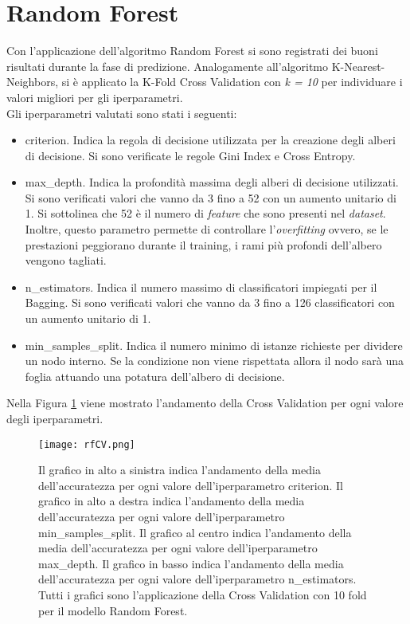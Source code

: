 \section{Random Forest}
Con l'applicazione dell'algoritmo Random Forest si sono registrati dei buoni risultati durante la fase di predizione. Analogamente all'algoritmo K-Nearest-Neighbors, si è applicato la K-Fold Cross Validation con \emph{k = 10} per individuare i valori migliori per gli iperparametri.\\
Gli iperparametri valutati sono stati i seguenti:
\begin{itemize}
	\item \textsf{criterion}. Indica la regola di decisione utilizzata per la creazione degli alberi di decisione. Si sono verificate le regole Gini Index e Cross Entropy.
	\item \textsf{max\_depth}. Indica la profondità massima degli alberi di decisione utilizzati. Si sono verificati valori che vanno da 3 fino a 52 con un aumento unitario di 1. Si sottolinea che 52 è il numero di \emph{feature} che sono presenti nel \emph{dataset}. Inoltre, questo parametro permette di controllare l'\emph{overfitting} ovvero, se le prestazioni peggiorano durante il training, i rami più profondi dell'albero vengono tagliati.
	\item \textsf{n\_estimators}. Indica il numero massimo di classificatori impiegati per il Bagging. Si sono verificati valori che vanno da 3 fino a 126 classificatori con un aumento unitario di 1.
	\item \textsf{min\_samples\_split}. Indica il numero minimo di istanze richieste per dividere un nodo interno. Se la condizione non viene rispettata allora il nodo sarà una foglia attuando una potatura dell'albero di decisione.
\end{itemize}
Nella Figura \ref{fig:rfCV} viene mostrato l'andamento della Cross Validation per ogni valore degli iperparametri.
\begin{figure}[]
	\begin{center}
		\texttt{[image: rfCV.png]}
		\caption{Il grafico in alto a sinistra indica l'andamento della media dell'accuratezza per ogni valore dell'iperparametro \textsf{criterion}. Il grafico in alto a destra indica l'andamento della media dell'accuratezza per ogni valore dell'iperparametro \textsf{min\_samples\_split}. Il grafico al centro indica l'andamento della media dell'accuratezza per ogni valore dell'iperparametro \textsf{max\_depth}. Il grafico in basso indica l'andamento della media dell'accuratezza per ogni valore dell'iperparametro \textsf{n\_estimators}. Tutti i grafici sono l'applicazione della Cross Validation con 10 fold per il modello Random Forest. 
		} 
		\label{fig:rfCV}
	\end{center}
\end{figure}
